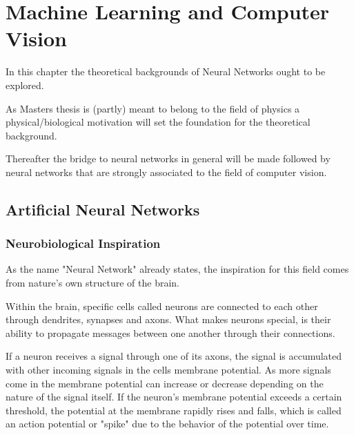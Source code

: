 \setchapterpreamble[u]{\margintoc}
\chapter{Machine Learning and Computer Vision}
In this chapter the theoretical backgrounds of Neural Networks ought to be explored.

As Masters thesis is (partly) meant to belong to the field of physics a physical/biological motivation will set the foundation for the theoretical background.

Thereafter the bridge to neural networks in general will be made followed by neural networks that are strongly associated to the field of computer vision.

\section{Artificial Neural Networks}

\subsection{Neurobiological Inspiration}







As the name "Neural Network" already states, the inspiration for this field comes from nature's own structure of the brain.

Within the brain, specific cells called neurons are connected to each other through dendrites, synapses and axons.
What makes neurons special, is their ability to propagate messages between one another through their connections.

If a neuron receives a signal through one of its axons, the signal is accumulated with other incoming signals in the cells membrane potential.
As more signals come in the membrane potential can increase or decrease depending on the nature of the signal itself.
If the neuron's membrane potential exceeds a certain threshold, the potential at the membrane rapidly rises and falls, which is called an action potential or "spike" due to the behavior of the potential over time.

